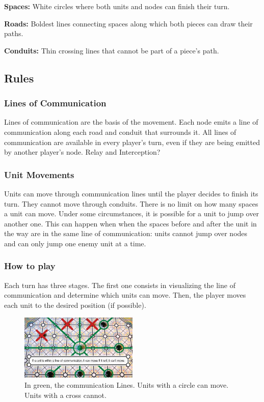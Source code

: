 \documentclass[a4paper]{article}
\begin{document}
\textbf{Spaces: }White circles where both units and nodes can finish their turn.

\textbf{Roads: }Boldest lines connecting spaces along which both pieces can draw their paths.

\textbf{Conduits: }Thin crossing lines that cannot be part of a piece's path.


\subsection{Rules}

\subsubsection{Lines of Communication}

Lines of communication are the basis of the movement. Each node emits a line of communication along each road and conduit that surrounds it. All lines of communication are available in every player's turn, even if they are being emitted by another player's node. 
Relay and Interception?


\subsubsection{Unit Movements}

Units can move through communication lines until the player decides to finish its turn. They cannot move through conduits. There is no limit on how many spaces a unit can move.
Under some circumstances, it is possible for a unit to jump over another one. This can happen when when the spaces before and after the unit in the way are in the same line of communication: units cannot jump over nodes and can only jump one enemy unit at a time.



\subsubsection{How to play}
Each turn has three stages. The first one consists in visualizing the line of communication and determine which units can move. Then, the player moves each unit to the desired position (if possible).
\begin{figure}[h!]
	\centering
	\includegraphics[width=0.5\textwidth]{signallines.jpg}
	\caption{In green, the communication Lines. Units with a circle can move. Units with a cross cannot.}
	\label{Image: signallines}
\end{figure}
\end{document}
